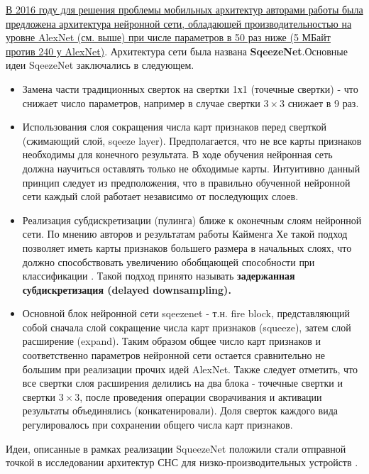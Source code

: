 \documentclass[12pt]{article}
\begin{document}
\begin{sloppypar}
\uline{В 2016 году для решения проблемы мобильных архитектур авторами работы \cite{iandola2016squeezenet} была предложена архитектура нейронной сети, обладающей производительностью на уровне AlexNet (см. выше) при числе параметров в 50 раз ниже (5 МБайт против 240 у AlexNet)}. Архитектура сети была названа \textbf{SqeezeNet}.Основные идеи SqeezeNet заключались в следующем.
\begin{itemize}\itemsep 0.25em  
    \item Замена части традиционных сверток на свертки 1х1 (точечные свертки) - что снижает число параметров, например в случае свертки $3\times3$ снижает в 9 раз.
    \item Использования слоя сокращения числа карт признаков перед сверткой (сжимающий слой, sqeeze layer). Предполагается, что не все карты признаков необходимы для конечного результата. В ходе обучения нейронная сеть должна научиться оставлять только не обходимые карты. Интуитивно данный принцип следует из предположения, что в правильно обученной нейронной сети каждый слой работает независимо от последующих слоев.
    \item Реализация субдискретизации (пулинга) ближе к оконечным слоям нейронной сети. По мнению авторов и результатам работы Кайменга Хе такой подход позволяет иметь карты признаков большего размера в начальных слоях, что должно способствовать увеличению обобщающей способности при классификации \cite{he2015convolutional}. Такой подход принято называть \textbf{задержанная субдискретизация (delayed downsampling).}
    \item Основной блок нейронной сети sqeezenet - т.н. fire block, представляющий собой сначала слой сокращение числа карт признаков (squeeze), затем слой расширение (expand). Таким образом общее число карт признаков и соответственно параметров нейронной сети остается сравнительно не большим при реализации прочих идей AlexNet. Также следует отметить, что все свертки слоя расширения делились на два блока - точечные свертки и свертки $3\times3$, после проведения операции сворачивания и активации результаты объединялись (конкатенировали). Доля сверток каждого вида регулировалось при сохранении общего числа карт признаков.
\end{itemize}
Идеи, описанные в рамках реализации SqueezeNet положили стали отправной точкой в исследовании архитектур СНС для низко-производительных устройств \cite{Hollemans2020NewMB, li2021survey}. 


\end{sloppypar}
\end{document}
